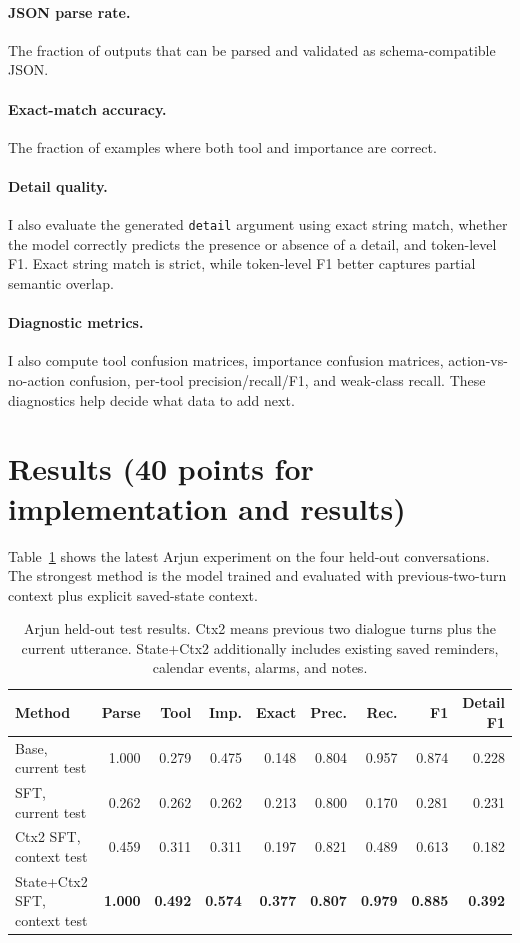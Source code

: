 \documentclass[11pt,a4paper]{article}
\begin{document}
\paragraph{JSON parse rate.}
The fraction of outputs that can be parsed and validated as schema-compatible JSON.

\paragraph{Exact-match accuracy.}
The fraction of examples where both tool and importance are correct.

\paragraph{Detail quality.}
I also evaluate the generated \texttt{detail} argument using exact string match, whether the model correctly predicts the presence or absence of a detail, and token-level F1. Exact string match is strict, while token-level F1 better captures partial semantic overlap.

\paragraph{Diagnostic metrics.}
I also compute tool confusion matrices, importance confusion matrices, action-vs-no-action confusion, per-tool precision/recall/F1, and weak-class recall. These diagnostics help decide what data to add next.

\section{Results (40 points for implementation and results)}

Table~\ref{tab:arjun-results} shows the latest Arjun experiment on the four held-out conversations. The strongest method is the model trained and evaluated with previous-two-turn context plus explicit saved-state context.

\begin{table}[t!]
\centering
\small
\begin{tabular}{lrrrrrrrr}
\toprule
Method & Parse & Tool & Imp. & Exact & Prec. & Rec. & F1 & Detail F1 \\
\midrule
Base, current test & 1.000 & 0.279 & 0.475 & 0.148 & 0.804 & 0.957 & 0.874 & 0.228 \\
SFT, current test & 0.262 & 0.262 & 0.262 & 0.213 & 0.800 & 0.170 & 0.281 & 0.231 \\
Ctx2 SFT, context test & 0.459 & 0.311 & 0.311 & 0.197 & 0.821 & 0.489 & 0.613 & 0.182 \\
State+Ctx2 SFT, context test & \textbf{1.000} & \textbf{0.492} & \textbf{0.574} & \textbf{0.377} & \textbf{0.807} & \textbf{0.979} & \textbf{0.885} & \textbf{0.392} \\
\bottomrule
\end{tabular}
\caption{Arjun held-out test results. Ctx2 means previous two dialogue turns plus the current utterance. State+Ctx2 additionally includes existing saved reminders, calendar events, alarms, and notes.}
\label{tab:arjun-results}
\end{table}
\end{document}
